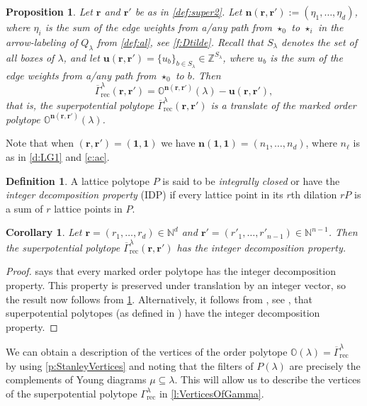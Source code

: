 \documentclass{amsart}
\newtheorem{corollary}[thm]{Corollary}
\newtheorem{proposition}[thm]{Proposition}
\theoremstyle{definition}
\newtheorem{definition}[thm]{Definition}
\numberwithin{equation}{section}
\newcommand{\rr}{\mathbf r}
\newcommand{\nn}{\mathbf n}
\newcommand{\uu}{\mathbf u}
\newcommand{\rect}{\mathrm{rec}}
\newcommand{\OO}{\mathbb{O}}
\newcommand{\rGamma}{\overline{\Gamma}}
\newcommand{\Z}{\mathbb{Z}}
\begin{document}
\begin{proposition}\label{prop:markedorder}
Let $\rr$ and $\rr'$ be as in \cref{def:super2}.
	Let $\nn(\rr,\rr'):=(\eta_1,\dots,\eta_d)$, where $\eta_i$ is the sum of the edge weights from 
	a/any path from $\star_0$ to $\star_i$ in the arrow-labeling of $Q_\lambda$ 
	from \cref{def:al}, see  
	\cref{f:Dtilde}.
	Recall that $S_{\lambda}$ denotes the set of all boxes of $\lambda$,
	and let $\uu(\rr,\rr')=\{u_b\}_{b\in S_{\lambda}} \in \Z^{S_{\lambda}}$,
	where $u_b$ is the sum of the edge weights from a/any path from $\star_0$ to $b$.
	Then $$\rGamma_{\rect}^{\lambda}(\rr,\rr') 
	= \OO^{\nn(\rr,\rr')}(\lambda)-
	\uu(\rr,\rr'),$$ that is, 
	the superpotential polytope $\rGamma_{\rect}^{\lambda}(\rr,\rr')$ is a translate
	of the marked order polytope
	$\OO^{\nn(\rr,\rr')}(\lambda)$.
\end{proposition}

Note that when $(\mathbf r,\mathbf r')=(\mathbf 1,\mathbf 1)$ we have $\mathbf n(\mathbf 1,\mathbf 1)=(n_1,\dots, n_d)$, where $n_\ell$ is as in \cref{d:LG1} and \cref{c:ac}.

\begin{definition}\label{def:IDP}
  A lattice polytope $P$ is said to
be \emph{integrally closed} 
or have
the \emph{integer decomposition property} (IDP)
if every lattice point in its $r$th dilation $rP$ 
is a sum of $r$ lattice points in $P$.
\end{definition}



\begin{corollary}\label{cor:IDP}
Let $\rr=(r_1,\dots,r_d)\in \mathbb{N}^d$
and $\rr'=(r'_1,\dots,r'_{n-1})\in \mathbb{N}^{n-1}$.
Then the superpotential polytope 
$\rGamma^{\lambda}_{{\rect}}(\mathbf{r},\mathbf{r'})$ 
has the integer decomposition property.
\end{corollary}
\begin{proof}
\cite[Corollary 2.3]{FangFourier} says that every marked order polytope has the integer decomposition property.
This property is preserved under translation by an integer vector, 
so the result now follows from \cref{prop:markedorder}.
Alternatively, it follows from \cite[Theorem~2.4]{HPPS}, see \cite[Remark 5.6]{RWReflexive}, that superpotential polytopes
(as defined in \cite[Definition 5.2]{RWReflexive}) have the integer decomposition property.
\end{proof}

 We can obtain a description of the vertices of the order polytope 
 $\OO(\lambda) = 
\rGamma_{\rect}^{\lambda}$ 
 by using
\cref{p:StanleyVertices} and noting that 
the filters of $P(\lambda)$ are precisely the complements of Young diagrams $\mu\subseteq 
\lambda$.  This will allow us to describe the vertices of the superpotential
polytope $\Gamma_{\rect}^{\lambda}$ in 
	\cref{l:VerticesOfGamma}.
 
\end{document}
